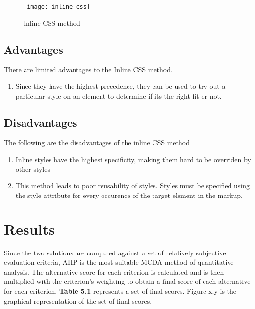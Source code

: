 \documentclass[12pt]{article}
\begin{document}
\vspace{0.5cm}

\begin{figure}[h]
\texttt{[image: inline-css]}
\centering
\caption{Inline CSS method}
\end{figure}

\subsection{Advantages}
There are limited advantages to the Inline CSS method.
\begin{enumerate}
	\item Since they have the highest precedence, they can be used to try out a particular style on an element to determine if its the right fit or not.
\end{enumerate}

\subsection{Disadvantages}
The following are the disadvantages of the inline CSS method
\begin{enumerate}
	\item Inline styles have the highest specificity, making them hard to be overriden by other styles.

	\item This method leads to poor reusability of styles. Styles must be specified using the style attribute for every occurence of the target element in the markup.
\end{enumerate}


\newpage

\section{Results}
Since the two solutions are compared against a set of relatively subjective evaluation criteria, AHP is the most suitable MCDA method of quantitative analysis. The alternative score for each criterion is calculated and is then multiplied with the criterion’s weighting to obtain a final score of each alternative for each criterion. \textbf{Table 5.1} represents a set of final scores. Figure x.y is the graphical representation of the set of final scores.

\vspace{0.5cm}
\end{document}
